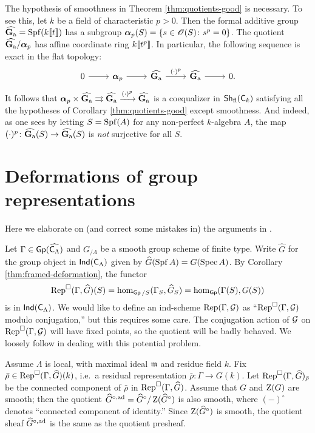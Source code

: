 \begin{example}
The hypothesis of smoothness in Theorem \ref{thm:quotients-good} is necessary. 
To see this, let $k$ be a field of characteristic $p>0$. Then the formal 
additive group $\widehat{\mathbf{G}_\mathrm{a}}=\operatorname{Spf}(k\llbracket t \rrbracket)$ has a subgroup 
${\boldsymbol\alpha}_p(S) = \{s\in \mathscr{O}(S)\colon s^p=0\}$. 
The quotient $\widehat{\mathbf{G}_\mathrm{a}}/{\boldsymbol\alpha}_p$ has affine coordinate ring 
$k\llbracket t^p \rrbracket$. In particular, the following sequence is exact in the flat 
topology:
\[
\begin{tikzcd}
	0 \ar[r]
		& \balpha_p \ar[r]
		& \widehat\Ga \ar[r, "(\cdot)^p"]
		& \widehat\Ga \ar[r]
		& 0 .
\end{tikzcd}
\]
It follows that 
${\boldsymbol\alpha}_p\times \widehat{\mathbf{G}_\mathrm{a}}\rightrightarrows\widehat{\mathbf{G}_\mathrm{a}}\xrightarrow{(\cdot)^p} \widehat{\mathbf{G}_\mathrm{a}}$
is a coequalizer in $\operatorname{\mathsf{Sh}}_{\mathrm{fl}}(\mathsf{C}_k)$ satisfying all the hypotheses of 
Corollary \ref{thm:quotients-good} except smoothness. And indeed, as one sees 
by letting $S=\operatorname{Spf}(A)$ for any non-perfect $k$-algebra $A$, the map 
$(\cdot)^p\colon \widehat{\mathbf{G}_\mathrm{a}}(S)\to \widehat{\mathbf{G}_\mathrm{a}}(S)$ is \emph{not} surjective for 
all $S$. 
\end{example}





\section{Deformations of group representations}

Here we elaborate on (and correct some mistakes in) the arguments in 
\cite[\S 2.1]{bockle-2013}. 

Let $\Gamma\in \operatorname{\mathsf{Gp}}(\widehat{\mathsf{C}_\Lambda})$ and $G_{/\Lambda}$ be a smooth 
group scheme of finite type. Write $\widehat G$ for the group object in 
$\operatorname{\mathsf{Ind}}(\mathsf{C}_\Lambda)$ given by $\widehat G(\operatorname{Spf} A) = G(\operatorname{Spec} A)$. By 
Corollary \ref{thm:framed-deformation}, the functor 
\[
  \operatorname{Rep}^\square(\Gamma,\widehat G)(S) = \hom_{\operatorname{\mathsf{Gp}}/S}(\Gamma_S,\widehat G_S) = \hom_{\operatorname{\mathsf{Gp}}}(\Gamma(S), G(S)) 
\]
is in $\operatorname{\mathsf{Ind}}(\mathsf{C}_\Lambda)$. We would like to define an ind-scheme 
$\operatorname{Rep}(\Gamma,\mathcal{G})$ as ``$\operatorname{Rep}^\square(\Gamma,\mathcal{G})$ modulo conjugation,'' but 
this requires some care. The conjugation action of $\mathcal{G}$ on 
$\operatorname{Rep}^\square(\Gamma,\mathcal{G})$ will have fixed points, so the quotient will be 
badly behaved. We loosely follow \cite[Ch.~2--3]{tilouine-1996} in dealing with 
this potential problem. 

Assume $\Lambda$ is local, with maximal ideal $\mathfrak{m}$ and residue field $k$. 
Fix $\bar\rho\in \operatorname{Rep}^\square(\Gamma,\widehat G)(k)$, i.e.~a residual 
representation $\bar\rho\colon \Gamma\to G(k)$. Let 
$\operatorname{Rep}^\square(\Gamma,\widehat G)_{\bar\rho}$ be the connected component of 
$\bar\rho$ in $\operatorname{Rep}^\square(\Gamma,\widehat G)$. Assume 
that $G$ and $\operatorname{Z}(G)$ are smooth; then the quotient 
$\widehat{G}^{\circ,\mathrm{ad}}=\widehat G^\circ/\operatorname{Z}(\widehat G^\circ)$ is also 
smooth, where $(-)^\circ$ denotes ``connected component of identity.'' 
Since $\operatorname{Z}(\widehat G^\circ)$ is smooth, the quotient sheaf 
$\widehat G^{\circ,\mathrm{ad}}$ is the same as the quotient presheaf. 

